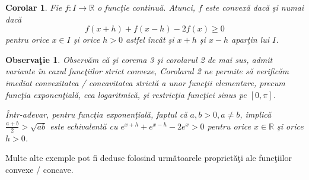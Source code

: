 \documentclass[a4paper,12pt,oneside]{report}
\newtheorem{remark}{Observa\c{t}ie}
\newtheorem{corollary}{Corolar}
\begin{document}
\begin{corollary}
Fie \(f: I \rightarrow \mathbb{R}\) o func\c{t}ie continu\u{a}. Atunci, \(f\) este convex\u{a} dac\u{a} \c{s}i numai dac\u{a}
\begin{displaymath}
  f\left ( x+h \right )+ f\left ( x - h \right ) - 2f\left ( x \right )\geq 0
\end{displaymath}
pentru orice \(x \in I\) \c{s}i orice \(h > 0\) astfel \^{i}nc\^{a}t \c{s}i \(x + h\) \c{s}i \(x - h\) apar\c{t}in lui \(I\).
\end{corollary}
\begin{remark}
Observ\u{a}m c\u{a} \c{s}i eorema 3 \c{s}i corolarul 2 de mai sus, admit variante \^{i}n cazul func\c{t}iilor strict convexe,
Corolarul 2 ne permite s\u{a} verific\u{a}m imediat convexitatea / concavitatea strict\u{a} a unor func\c{t}ii elementare, precum func\c{t}ia exponen\c{t}ial\u{a}, cea logaritmic\u{a}, \c{s}i restric\c{t}ia func\c{t}iei sinus pe \(\left [ 0 , \pi \right ]\).

\^{I}ntr-adevar, pentru func\c{t}ia exponen\c{t}ial\u{a}, faptul c\u{a}  \(a , b > 0, a\neq b\), implic\u{a} \(\frac{a + b}{2}> \sqrt{ab}\)
este echivalent\u{a} cu
\(e^{x + h} + e^{x - h } - 2e^{x}> 0\)
pentru orice \(x\in \mathbb{R}\) \c{s}i orice \(h > 0\).
\end{remark}
  Multe alte exemple pot fi deduse folosind urm\u{a}toarele propriet\u{a}\c{t}i ale func\c{t}iilor convexe / concave.
\end{document}
